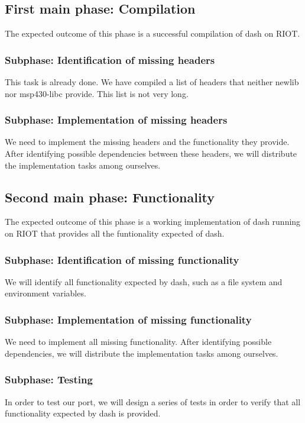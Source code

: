 \documentclass[11pt,
  a4paper,
  BCOR=7mm
]{scrartcl}
\begin{document}
\subsection*{First main phase: Compilation}
\label{sub:compilation}
The expected outcome of this phase is a successful compilation of dash
on RIOT.

\subsubsection*{Subphase: Identification of missing headers}
\label{ssub:headers_identification}
This task is already done. We have compiled a list of headers that
neither newlib nor msp430-libc provide. This list is not very long.

\subsubsection*{Subphase: Implementation of missing headers}
\label{ssub:headers_implementation}
We need to implement the missing headers and the functionality they
provide. After identifying possible dependencies between these headers,
we will distribute the implementation tasks among ourselves.

\subsection*{Second main phase: Functionality}
\label{sub:functionality}
The expected outcome of this phase is a working implementation of dash
running on RIOT that provides all the funtionality expected of dash.

\subsubsection*{Subphase: Identification of missing functionality}
\label{ssub:functionality_identification}
We will identify all functionality expected by dash, such as a file
system and environment variables.

\subsubsection*{Subphase: Implementation of missing functionality}
\label{ssub:functionality_implementation}
We need to implement all missing functionality. After identifying
possible dependencies, we will distribute the implementation tasks among
ourselves.

\subsubsection*{Subphase: Testing}
\label{ssub:testing}
In order to test our port, we will design a series of tests in order to
verify that all functionality expected by dash is provided.
\end{document}
